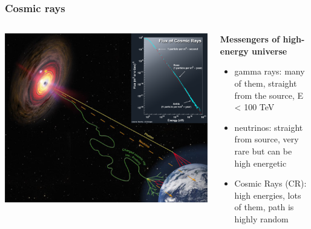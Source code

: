 \documentclass[aspectratio=1610, 9pt]{beamer}
\begin{document}
\begin{frame}\frametitle{Cosmic rays}
  \begin{columns}
    \begin{column}[c]{0.48\textwidth}
      \includegraphics[width=\textwidth]{CR_cta.png}
    \end{column}
    \begin{column}[c]{0.48\textwidth}
      \textbf{Messengers of high-energy universe}
      \begin{itemize}
        \item gamma rays: many of them, straight from the source, E < 100 TeV
        \item neutrinos: straight from source, very rare but can be high energetic
        \item Cosmic Rays (CR): high energies, lots of them, path is highly random
      \end{itemize}
    \end{column}
  \end{columns}
\end{frame}
\end{document}

